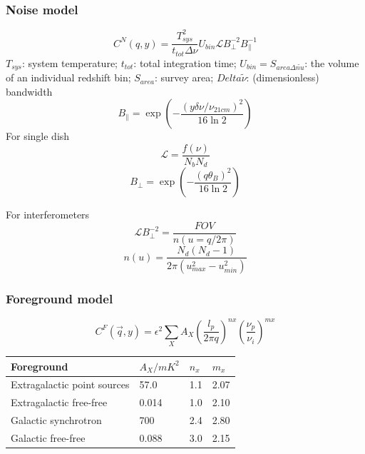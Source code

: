 \documentclass[UTF8]{beamer}
\begin{document}
\begin{frame}
    \frametitle{Noise model}
    \begin{equation}
        C^{N}(q,y)=\frac{T_{sys}^2}{t_{tot}\Delta \nu}U_{bin}\mathcal{L}B_{\perp}^{-2}B_{\parallel}^{-1}
    \end{equation}
    $T_{sys}$: system temperature; $t_{tot}$: total integration time; $U_{bin}=S_{area\Delta\tilde{nu}}$: the volume of an individual redshift bin; $S_{area}$: survey area; $
    Delta \tilde{\nu}$: (dimensionless) bandwidth
    \begin{equation}
        B_{\parallel}=\exp(-\frac{(y\delta\nu/\nu_{21cm})^2}{16\ln 2})
    \end{equation}
    For single dish
    \begin{equation}
        \mathcal{L}=\frac{f(\nu)}{N_bN_d}
    \end{equation}
    \begin{equation}
        B_{\perp}=\exp(-\frac{(q\theta_B)^2}{16\ln 2})
    \end{equation}
    
\end{frame}
\begin{frame}
    For interferometers
    \begin{equation}
        \mathcal{L}B_{\perp}^{-2}=\frac{FOV}{n(u=q/2\pi)}
    \end{equation}
    \begin{equation}
        n(u)=\frac{N_d(N_d-1)}{2\pi(u_{max}^2-u_{min}^2)}
    \end{equation}
\end{frame}
\begin{frame}
    \frametitle{Foreground model}
    \begin{equation}
        C^F(\vec{q},y)=\epsilon^2\sum_{X}A_{X}(\frac{l_p}{2\pi q})^{nx}(\frac{\nu_p}{\nu_i})^{mx}
    \end{equation}
    \begin{table}[]
        \begin{tabular}{l|lll}
        \hline
        Foreground                  & $A_X/mK^2$ & $n_x$                    & $m_x$                     \\ \hline
        Extragalactic point sources & 57.0       & 1.1                      & 2.07                      \\
        Extragalactic free-free     & 0.014      & 1.0                      & 2.10                      \\
        Galactic synchrotron        & 700        & 2.4                      & 2.80                      \\ 
        Galactic free-free          & 0.088      & 3.0 & 2.15 \\ \hline
        \end{tabular}
    \end{table}
\end{frame}
\end{document}
